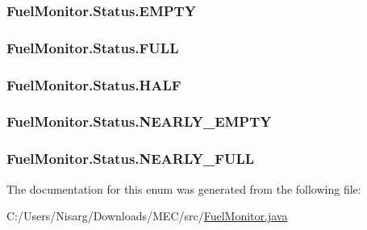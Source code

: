 \subsubsection[{E\+M\+P\+T\+Y}]{\setlength{\rightskip}{0pt plus 5cm}Fuel\+Monitor.\+Status.\+E\+M\+P\+T\+Y}\label{enum_fuel_monitor_1_1_status_a6e7f29a533b83c823250c0c78878a780}
\hypertarget{enum_fuel_monitor_1_1_status_aac352dcb5d9ecb69f41f01e56fb82d55}{}
\subsubsection[{F\+U\+L\+L}]{\setlength{\rightskip}{0pt plus 5cm}Fuel\+Monitor.\+Status.\+F\+U\+L\+L}\label{enum_fuel_monitor_1_1_status_aac352dcb5d9ecb69f41f01e56fb82d55}
\hypertarget{enum_fuel_monitor_1_1_status_ac5010cffc823969514006118522e7523}{}
\subsubsection[{H\+A\+L\+F}]{\setlength{\rightskip}{0pt plus 5cm}Fuel\+Monitor.\+Status.\+H\+A\+L\+F}\label{enum_fuel_monitor_1_1_status_ac5010cffc823969514006118522e7523}
\hypertarget{enum_fuel_monitor_1_1_status_ac7ee466e69fa982a98b9001959ad1524}{}
\subsubsection[{N\+E\+A\+R\+L\+Y\+\_\+\+E\+M\+P\+T\+Y}]{\setlength{\rightskip}{0pt plus 5cm}Fuel\+Monitor.\+Status.\+N\+E\+A\+R\+L\+Y\+\_\+\+E\+M\+P\+T\+Y}\label{enum_fuel_monitor_1_1_status_ac7ee466e69fa982a98b9001959ad1524}
\hypertarget{enum_fuel_monitor_1_1_status_af2c6e63cd53ffba5b4b920c59aa8529b}{}
\subsubsection[{N\+E\+A\+R\+L\+Y\+\_\+\+F\+U\+L\+L}]{\setlength{\rightskip}{0pt plus 5cm}Fuel\+Monitor.\+Status.\+N\+E\+A\+R\+L\+Y\+\_\+\+F\+U\+L\+L}\label{enum_fuel_monitor_1_1_status_af2c6e63cd53ffba5b4b920c59aa8529b}


The documentation for this enum was generated from the following file\+:\begin{DoxyCompactItemize}
\item 
C\+:/\+Users/\+Nisarg/\+Downloads/\+M\+E\+C/src/\hyperlink{_fuel_monitor_8java}{Fuel\+Monitor.\+java}\end{DoxyCompactItemize}
